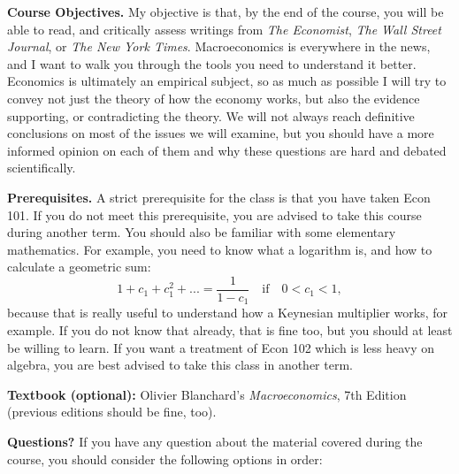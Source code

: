 \documentclass[]{book}
\theoremstyle{definition}
\theoremstyle{definition}
\theoremstyle{definition}
\theoremstyle{remark}
\begin{document}
\textbf{Course Objectives.} My objective is that, by the end of the
course, you will be able to read, and critically assess writings from
\emph{The Economist}, \emph{The Wall Street Journal}, or \emph{The New
York Times}. Macroeconomics is everywhere in the news, and I want to
walk you through the tools you need to understand it better. Economics
is ultimately an empirical subject, so as much as possible I will try to
convey not just the theory of how the economy works, but also the
evidence supporting, or contradicting the theory. We will not always
reach definitive conclusions on most of the issues we will examine, but
you should have a more informed opinion on each of them and why these
questions are hard and debated scientifically.

\textbf{Prerequisites.} A strict prerequisite for the class is that you
have taken Econ 101. If you do not meet this prerequisite, you are
advised to take this course during another term. You should also be
familiar with some elementary mathematics. For example, you need to know
what a logarithm is, and how to calculate a geometric sum:
\[1+c_1+c_1^2+...=\frac{1}{1-c_1} \quad \text{if} \quad 0<c_1<1,\]
because that is really useful to understand how a Keynesian multiplier
works, for example. If you do not know that already, that is fine too,
but you should at least be willing to learn. If you want a treatment of
Econ 102 which is less heavy on algebra, you are best advised to take
this class in another term.

\textbf{Textbook (optional):} Olivier Blanchard's \emph{Macroeconomics},
7th Edition (previous editions should be fine, too).

\textbf{Questions?} If you have any question about the material covered
during the course, you should consider the following options in order:
\end{document}
